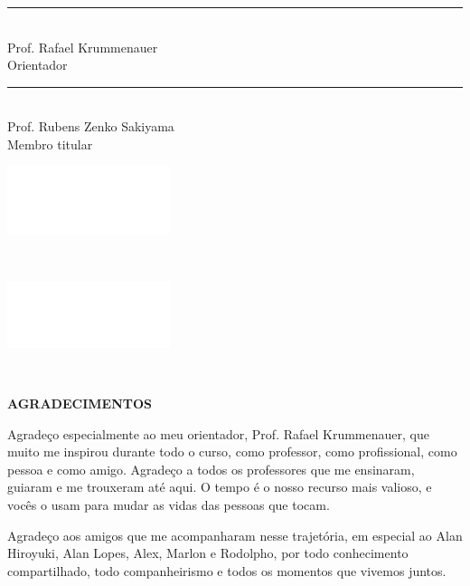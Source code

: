 \documentclass[12pt,a4paper]{report}
\begin{document}
\rule [0cm]{10cm}{0.1pt}\\
Prof. Rafael Krummenauer\\
Orientador\\[2.41cm]

\rule [0cm]{10cm}{0.1pt}\\
Prof. Rubens Zenko Sakiyama\\
Membro titular\\[2.41cm]

\thispagestyle{empty}
\clearpage

\begin{minipage}{0.9\linewidth}
  \includegraphics[scale=0.01]{images/branco} 
\end{minipage}\\[21cm]

\begin{minipage}{0.59\linewidth}
  \includegraphics[scale=0.01]{images/branco} 
\end{minipage}
\begin{minipage}{0.4\linewidth}

\end{minipage}\\[18cm]


\thispagestyle{empty}
\clearpage

{
  \center \Large \bf AGRADECIMENTOS
}\\[1cm]

\justifying

Agradeço especialmente ao meu orientador, Prof. Rafael Krummenauer, que muito me inspirou durante todo o curso,
como professor, como profissional, como pessoa e como amigo. Agradeço a todos os professores que me ensinaram,
guiaram e me trouxeram até aqui. O tempo é o nosso recurso mais valioso, e vocês o usam para mudar as vidas
das pessoas que tocam.

Agradeço aos amigos que me acompanharam nesse trajetória, em especial ao Alan Hiroyuki, Alan Lopes, Alex, Marlon
e Rodolpho, por todo conhecimento compartilhado, todo companheirismo e todos os momentos que vivemos juntos.
\end{document}
